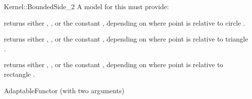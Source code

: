 \begin{ccRefFunctionObjectConcept}{Kernel::BoundedSide_2}
A model for this must provide:


{returns either ,
 , or the constant
 , depending on where point  is relative to
circle .}

{returns either ,
 , or the constant
 , depending on where point  is relative to
triangle .}

{returns either ,
 , or the constant
 , depending on where point  is relative to
rectangle .}

\ccRefines
AdaptableFunctor (with two arguments)

\ccSeeAlso
{} \\
 \\
  \\


\end{ccRefFunctionObjectConcept}

